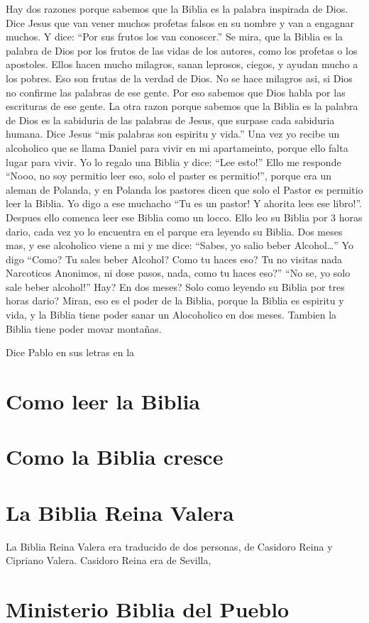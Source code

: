 Hay dos razones porque sabemos que la Biblia es la palabra inspirada de
Dios. Dice Jesus que van vener muchos profetas falsos en su nombre y van
a engagnar muchos. Y dice: ``Por sus frutos los van conoscer.'' Se mira,
que la Biblia es la palabra de Dios por los frutos de las vidas de los
autores, como los profetas o los apostoles. Ellos hacen mucho milagros,
sanan leprosos, ciegos, y ayudan mucho a los pobres. Eso son frutas de
la verdad de Dios. No se hace milagros asi, si Dios no confirme las
palabras de ese gente. Por eso sabemos que Dios habla por las escrituras
de ese gente. La otra razon porque sabemos que la Biblia es la palabra
de Dios es la sabiduria de las palabras de Jesus, que surpase cada
sabiduria humana. Dice Jesus ``mis palabras son espiritu y vida.'' Una
vez yo recibe un alcoholico que se llama Daniel para vivir en mi
apartameinto, porque ello falta lugar para vivir. Yo lo regalo una
Biblia y dice: ``Lee esto!'' Ello me responde ``Nooo, no soy permitio
leer eso, solo el paster es permitio!'', porque era un aleman de
Polanda, y en Polanda los pastores dicen que solo el Pastor es permitio
leer la Biblia. Yo digo a ese muchacho ``Tu es un pastor! Y ahorita lees
ese libro!''. Despues ello comenca leer ese Biblia como un locco. Ello
leo su Biblia por 3 horas dario, cada vez yo lo encuentra en el parque
era leyendo su Biblia. Dos meses mas, y ese alcoholico viene a mi y me
dice: ``Sabes, yo salio beber Alcohol\ldots{}'' Yo digo ``Como? Tu sales
beber Alcohol? Como tu haces eso? Tu no visitas nada Narcoticos
Anonimos, ni dose pasos, nada, como tu haces eso?'' ``No se, yo solo
sale beber alcohol!'' Hay? En dos meses? Solo como leyendo su Biblia por
tres horas dario? Miran, eso es el poder de la Biblia, porque la Biblia
es espiritu y vida, y la Biblia tiene poder sanar un Alocoholico en dos
meses. Tambien la Biblia tiene poder movar montañas.

Dice Pablo en sus letras en la

\hypertarget{como-leer-la-biblia}{%
\section{Como leer la Biblia}\label{como-leer-la-biblia}}

\hypertarget{como-la-biblia-cresce}{%
\section{Como la Biblia cresce}\label{como-la-biblia-cresce}}

\hypertarget{la-biblia-reina-valera}{%
\section{La Biblia Reina Valera}\label{la-biblia-reina-valera}}

La Biblia Reina Valera era traducido de dos personas, de Casidoro Reina
y Cipriano Valera. Casidoro Reina era de Sevilla,

\hypertarget{ministerio-biblia-del-pueblo}{%
\section{Ministerio Biblia del
Pueblo}\label{ministerio-biblia-del-pueblo}}
